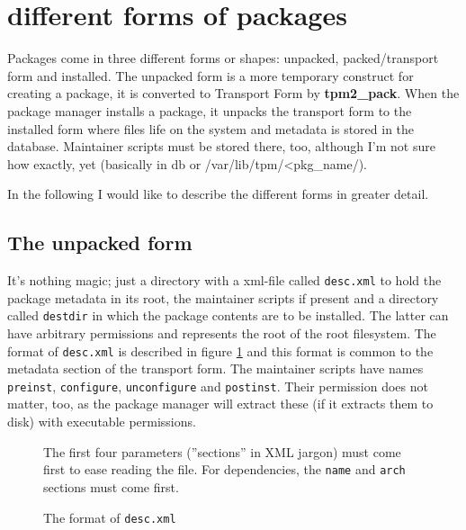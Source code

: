 \documentclass[a4paper]{scrartcl}
\newcommand{\file}[1]{\texttt{#1}}
\newcommand{\program}[1]{\textbf{#1}}
\begin{document}
	
	\section{different forms of packages}
	\label{sec:differnt_forms_of_packages}
	
	Packages come in three different forms or shapes: unpacked, packed/transport form and installed. The unpacked form is a more temporary construct for creating a package, it is converted to Transport Form by \program{tpm2\_pack}. When the package manager installs a package, it unpacks the transport form to the installed form where files life on the system and metadata is stored in the database. Maintainer scripts must be stored there, too, although I'm not sure how exactly, yet (basically in db or /var/lib/tpm/<pkg\_name/).
	
	In the following I would like to describe the different forms in greater detail.
	
	
	\subsection{The unpacked form}
	\label{ssec:the_unpacked_form}
	
	It's nothing magic; just a directory with a xml-file called \file{desc.xml} to hold the package metadata in its root, the maintainer scripts if present and a directory called \file{destdir} in which the package contents are to be installed. The latter can have arbitrary permissions and represents the root of the root filesystem. The format of \file{desc.xml} is described in figure \ref{fig:the_format_of_desc_xml} and this format is common to the metadata section of the transport form. The maintainer scripts have names \file{preinst}, \file{configure}, \file{unconfigure} and \file{postinst}. Their permission does not matter, too, as the package manager will extract these (if it extracts them to disk) with executable permissions.
	
	\begin{figure}[ht]
	
		\vspace{1eM}
	
		The first four parameters (''sections'' in XML jargon) must come first to ease reading the file. For dependencies, the \texttt{name} and \texttt{arch} sections must come first.
		
		\caption{The format of \file{desc.xml}}
		\label{fig:the_format_of_desc_xml}
	\end{figure}
	
\end{document}
